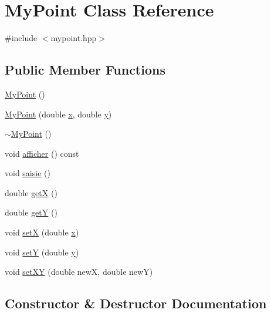 \hypertarget{classMyPoint}{}\section{My\+Point Class Reference}
\label{classMyPoint}


{\ttfamily \#include $<$mypoint.\+hpp$>$}

\subsection*{Public Member Functions}
\begin{DoxyCompactItemize}
\item 
\hyperlink{classMyPoint_a20fd377ec5618ba450fa1d41c2e2f003}{My\+Point} ()
\item 
\hyperlink{classMyPoint_a640ce7e8c75f6c6fe1988c8c5dc253a7}{My\+Point} (double \hyperlink{addition_8c_a6150e0515f7202e2fb518f7206ed97dc}{x}, double \hyperlink{addition_8c_a0a2f84ed7838f07779ae24c5a9086d33}{y})
\item 
\hyperlink{classMyPoint_ad37c10040bd5b91f28736b4cf4bfdb67}{$\sim$\+My\+Point} ()
\item 
void \hyperlink{classMyPoint_a17ec468a4333841177496a17d4dc1d62}{afficher} () const
\item 
void \hyperlink{classMyPoint_a8d15eb173641e8c2c9a783eb8776dd0c}{saisie} ()
\item 
double \hyperlink{classMyPoint_aa9e91ac26c7499b627a0b2bed467ff16}{getX} ()
\item 
double \hyperlink{classMyPoint_a23b042effe628a6aea0f93d922892953}{getY} ()
\item 
void \hyperlink{classMyPoint_a927c5f22cda376e37b6432400ca23d07}{setX} (double \hyperlink{addition_8c_a6150e0515f7202e2fb518f7206ed97dc}{x})
\item 
void \hyperlink{classMyPoint_aca5495247b2df8dd262e6d138de4029b}{setY} (double \hyperlink{addition_8c_a0a2f84ed7838f07779ae24c5a9086d33}{y})
\item 
void \hyperlink{classMyPoint_a2814ad77927c5f38587dfd70076c4710}{set\+XY} (double newX, double newY)
\end{DoxyCompactItemize}


\subsection{Constructor \& Destructor Documentation}
\mbox{\label{classMyPoint_a20fd377ec5618ba450fa1d41c2e2f003}} 
